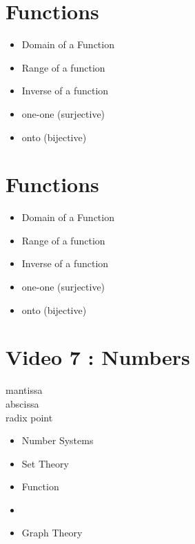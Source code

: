 \documentclass[]{report}
\begin{document}
\begin{enumerate}
\section*{Functions}
\begin{itemize}
\item Domain of a Function
\item Range of a function
\item Inverse of a function
\end{itemize}
\begin{itemize}
\item one-one (surjective)
\item onto (bijective)
\end{itemize}


\section*{Functions}
\begin{itemize}
\item Domain of a Function
\item Range of a function
\item Inverse of a function
\end{itemize}
\begin{itemize}
\item one-one (surjective)
\item onto (bijective)
\end{itemize}






\section{Video 7 : Numbers}


\begin{description}
\item[mantissa]
\item[abscissa]
\item[radix point]
\end{description}

\begin{itemize}
\item Number Systems
\item Set Theory
\item Function
\item 
\item Graph Theory
\end{itemize}




\end{enumerate}
\end{document}
